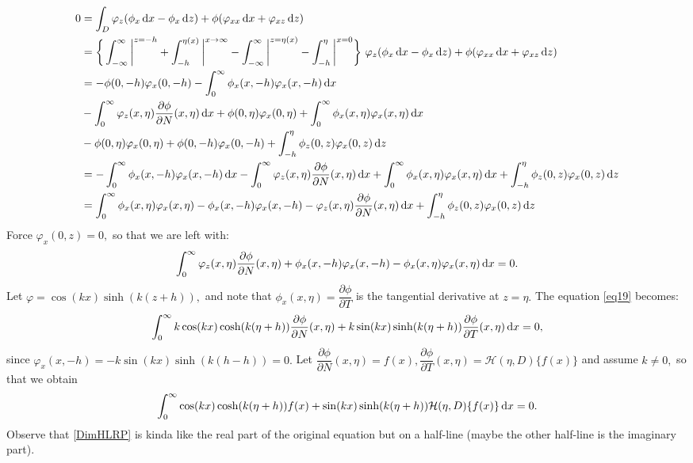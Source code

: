 \documentclass[10pt,reqno,oneside,a4paper]{article}
\begin{document}
\begin{align*}
0 &= \int_D \varphi_z(\phi_x \,\mathrm{d} x - \phi_x \,\mathrm{d} z) + \phi(\varphi_{xx} \,\mathrm{d} x + \varphi_{xz} \,\mathrm{d} z) \\
&= \bigg\{ \int_{-\infty}^{\infty} \bigg|^{z=-h} + \int^{\eta(x)}_{-h} \bigg|^{x \to \infty} - \int^{\infty}_{-\infty} \bigg|^{z= \eta(x)} - \int^{\eta}_{-h} \bigg|^{x=0} \bigg\} ~ \varphi_z(\phi_x \,\mathrm{d} x - \phi_x \,\mathrm{d} z) + \phi(\varphi_{xx} \,\mathrm{d} x + \varphi_{xz} \,\mathrm{d} z) \\
&= - \phi(0,-h) \varphi_{x}(0,-h) - \int^{\infty}_{0} \phi_x(x,-h) \varphi_x(x,-h) \,\mathrm{d} x \\
&- \int_{0}^{\infty} \varphi_z(x, \eta)\frac{\partial \phi}{\partial N}(x, \eta)\,\mathrm{d} x + \phi(0, \eta) \varphi_x(0, \eta) + \int^{\infty}_{0}\phi_x(x, \eta)  \varphi_x(x, \eta) \,\mathrm{d} x \\
&-\phi(0, \eta) \varphi_x(0, \eta) + \phi(0, -h) \varphi_x(0, -h) + \int_{-h}^{\eta} \phi_{z}(0,z) \varphi_{x}(0,z) \,\mathrm{d} z \\
&=- \int^{\infty}_{0} \phi_x(x,-h) \varphi_x(x,-h) \,\mathrm{d} x- \int_{0}^{\infty} \varphi_z(x, \eta)\frac{\partial \phi}{\partial N}(x, \eta)\,\mathrm{d} x + \int^{\infty}_{0}\phi_x(x, \eta)  \varphi_x(x, \eta) \,\mathrm{d} x + \int_{-h}^{\eta} \phi_{z}(0,z) \varphi_{x}(0,z) \,\mathrm{d} z\\
&=\int^{\infty}_{0}\phi_x(x, \eta)  \varphi_x(x, \eta) -\phi_x(x,-h) \varphi_x(x,-h) - \varphi_z(x, \eta)\frac{\partial \phi}{\partial N}(x, \eta) \,\mathrm{d} x  + \int_{-h}^{\eta} \phi_{z}(0,z) \varphi_{x}(0,z) \,\mathrm{d} z
\end{align*}
Force $\varphi_x(0,z) = 0,$ so that we are left with:
\begin{equation}\label{eq19}
\int_{0}^{\infty} \varphi_z(x, \eta)\frac{\partial \phi}{\partial N}(x, \eta) + \phi_x(x,-h) \varphi_x(x,-h) - \phi_x(x, \eta) \varphi_x(x, \eta) \,\mathrm{d} x = 0.
\end{equation}
Let $\varphi = \cos(kx) \sinh(k(z+h)),$ and note that $\phi_x(x, \eta) = \dfrac{\partial \phi}{\partial T}$ is the tangential derivative at $z = \eta.$ The equation \eqref{eq19} becomes:
\begin{equation}
\int_{0}^{\infty} k \cos(kx) \cosh(k(\eta+h)) \frac{\partial \phi}{\partial N}(x, \eta) + k \sin(kx) \sinh(k(\eta+h)) \dfrac{\partial \phi}{\partial T}(x, \eta) \,\mathrm{d} x = 0,
\end{equation}
since $\varphi_x(x,-h) = -k \sin(kx) \sinh(k(h-h)) = 0.$ Let $\dfrac{\partial \phi}{\partial N}(x, \eta) = f(x), \dfrac{\partial \phi}{\partial T}(x, \eta) = \mathcal{H}(\eta,D)\{ f(x) \}$ and assume $k \neq 0,$ so that we obtain
\begin{equation}\label{DimHLRP}
\int_{0}^{\infty} \cos(kx) \cosh(k(\eta+h)) f(x) + \sin(kx) \sinh(k(\eta+h))\mathcal{H}(\eta,D) \{f(x) \} \,\mathrm{d} x = 0.
\end{equation}
Observe that \eqref{DimHLRP} is kinda like the real part of the original equation but on a half-line (maybe the other half-line is the imaginary part).
\end{document}
